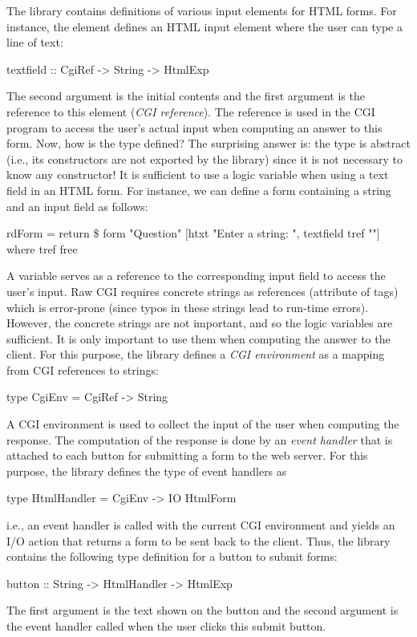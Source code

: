 The library  contains definitions of various input
elements for HTML forms.
For instance, the element  defines
an HTML input element where the user can type a line of text:
%
\begin{prog}
textfield :: CgiRef -> String -> HtmlExp
\end{prog}
%
The second argument is the initial contents and the first argument
is the reference to this element (\emph{CGI reference}).
The reference is used in the
CGI program to access the user's actual input when computing
an answer to this form.
Now, how is the type  defined?
The surprising answer is: the type is abstract (i.e., its constructors
are not exported by the  library) since
it is not necessary to know any constructor!
It is sufficient to use a logic variable when using a text field
in an HTML form.
For instance, we can define a form containing a string
and an input field as follows:
%
\begin{prog}
rdForm = return \$ form "Question"
          [htxt "Enter a string: ", textfield tref ""]
 where tref free
\end{prog}
%
A  variable serves as a reference to the corresponding
input field to access the user's input. Raw CGI requires concrete
strings as references (attribute  of  tags)
which is error-prone (since typos in these strings lead to
run-time errors).
However, the concrete strings are not important, and so the
logic variables are sufficient. It is only important
to use them when computing the answer to the client.
For this purpose, the library  defines
a \emph{CGI environment} as a mapping
from CGI references to strings:
%
\begin{prog}
type CgiEnv = CgiRef -> String
\end{prog}
%
A CGI environment is used to collect the input of the user
when computing the response. The computation of the response is done
by an \emph{event handler}
that is attached to each button for submitting a form to the web server.
For this purpose, the library 
defines the type of event handlers as
%
\begin{prog}
type HtmlHandler = CgiEnv -> IO HtmlForm
\end{prog}
%
i.e., an event handler is called with the current CGI environment and
yields an I/O action that returns a form to be sent back to the client.
Thus, the library  contains the following type definition
for a button to submit forms:
%
\begin{prog}
button :: String -> HtmlHandler -> HtmlExp
\end{prog}
%
The first argument is the text shown on the button
and the second argument is the event handler called when the user
clicks this submit button.

